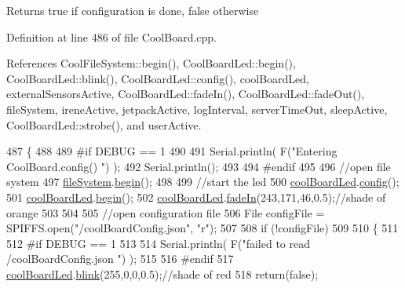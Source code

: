 \begin{DoxyReturn}{Returns}
true if configuration is done, false otherwise 
\end{DoxyReturn}


Definition at line 486 of file Cool\+Board.\+cpp.



References Cool\+File\+System\+::begin(), Cool\+Board\+Led\+::begin(), Cool\+Board\+Led\+::blink(), Cool\+Board\+Led\+::config(), cool\+Board\+Led, external\+Sensors\+Active, Cool\+Board\+Led\+::fade\+In(), Cool\+Board\+Led\+::fade\+Out(), file\+System, irene\+Active, jetpack\+Active, log\+Interval, server\+Time\+Out, sleep\+Active, Cool\+Board\+Led\+::strobe(), and user\+Active.


\begin{DoxyCode}
487 \{
488 
489 \textcolor{preprocessor}{#if DEBUG == 1}
490 
491     Serial.println( F(\textcolor{stringliteral}{"Entering CoolBoard.config() "}) );
492     Serial.println();
493 
494 \textcolor{preprocessor}{#endif}
495 
496     \textcolor{comment}{//open file system}
497     \hyperlink{classCoolBoard_a42c2586fbb13ff7f06538e9284e8538d}{fileSystem}.\hyperlink{classCoolFileSystem_a6ba6f666ed4c530174f8569d2c636748}{begin}();
498     
499     \textcolor{comment}{//start the led}
500     \hyperlink{classCoolBoard_a1b1d3c684a5baa56b08486e192fd8e97}{coolBoardLed}.\hyperlink{classCoolBoardLed_a1b60e5e30bea96c49ed62ed1bf1ffc8b}{config}();
501     \hyperlink{classCoolBoard_a1b1d3c684a5baa56b08486e192fd8e97}{coolBoardLed}.\hyperlink{classCoolBoardLed_ae3cbde8affcc6f011cbd698c8ef911f6}{begin}();
502     \hyperlink{classCoolBoard_a1b1d3c684a5baa56b08486e192fd8e97}{coolBoardLed}.\hyperlink{classCoolBoardLed_ab778f5e7bed0ab74e3906d82110493c3}{fadeIn}(243,171,46,0.5);\textcolor{comment}{//shade of orange     }
503 
504     
505     \textcolor{comment}{//open configuration file}
506     File configFile = SPIFFS.open(\textcolor{stringliteral}{"/coolBoardConfig.json"}, \textcolor{stringliteral}{"r"});
507     
508     \textcolor{keywordflow}{if} (!configFile)
509 
510     \{
511     
512 \textcolor{preprocessor}{    #if DEBUG == 1}
513 
514         Serial.println( F(\textcolor{stringliteral}{"failed to read /coolBoardConfig.json  "}) );
515 
516 \textcolor{preprocessor}{    #endif}
517         \hyperlink{classCoolBoard_a1b1d3c684a5baa56b08486e192fd8e97}{coolBoardLed}.\hyperlink{classCoolBoardLed_a96e1ea13003eee34c9dbcef340404426}{blink}(255,0,0,0.5);\textcolor{comment}{//shade of red     }
518         \textcolor{keywordflow}{return}(\textcolor{keyword}{false});

\end{DoxyCode}
